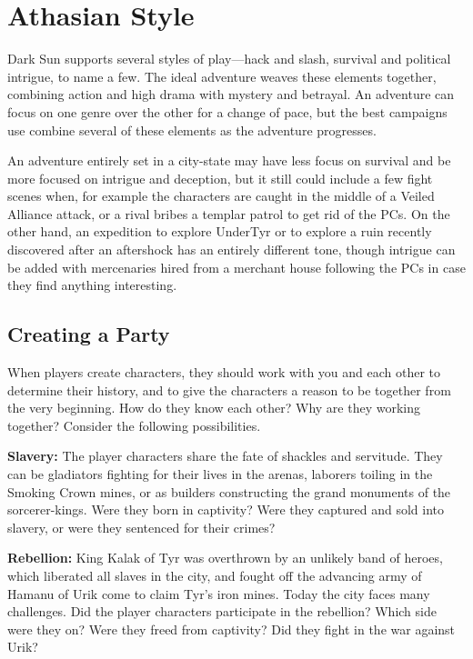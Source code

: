 \section{Athasian Style}
{\tableheader Dark Sun} supports several styles of play---hack and slash, survival and political intrigue, to name a few. The ideal adventure weaves these elements together, combining action and high drama with mystery and betrayal. An adventure can focus on one genre over the other for a change of pace, but the best campaigns use combine several of these elements as the adventure progresses.

An adventure entirely set in a city-state may have less focus on survival and be more focused on intrigue and deception, but it still could include a few fight scenes when, for example the characters are caught in the middle of a Veiled Alliance attack, or a rival bribes a templar patrol to get rid of the PCs. On the other hand, an expedition to explore UnderTyr or to explore a ruin recently discovered after an aftershock has an entirely different tone, though intrigue can be added with mercenaries hired from a merchant house following the PCs in case they find anything interesting.

\subsection{Creating a Party}
When players create characters, they should work with you and each other to determine their history, and to give the characters a reason to be together from the very beginning. How do they know each other? Why are they working together? Consider the following possibilities.

\textbf{Slavery:} The player characters share the fate of shackles and servitude. They can be gladiators fighting for their lives in the arenas, laborers toiling in the Smoking Crown mines, or as builders constructing the grand monuments of the sorcerer-kings. Were they born in captivity? Were they captured and sold into slavery, or were they sentenced for their crimes?

\textbf{Rebellion:} King Kalak of Tyr was overthrown by an unlikely band of heroes, which liberated all slaves in the city, and fought off the advancing army of Hamanu of Urik come to claim Tyr's iron mines. Today the city faces many challenges. Did the player characters participate in the rebellion? Which side were they on? Were they freed from captivity? Did they fight in the war against Urik?

